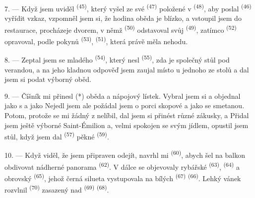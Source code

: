 7. --- Když jsem uviděl  \textsuperscript{(45)}, který vyšel ze své
 \textsuperscript{(47)} položené v 
\textsuperscript{(48)}, aby poslal  \textsuperscript{(46)} vyřídit vzkaz,
vzpomněl jsem si, že hodina oběda je blízko, a vstoupil jsem do restaurace, procházeje dvorem,
v němž  \textsuperscript{(50)} odstavoval svůj
 \textsuperscript{(49)}, zatímco 
\textsuperscript{(52)} opravoval, podle pokynů  \textsuperscript{(53)},
 \textsuperscript{(51)}, která právě měla nehodu.

8. --- Zeptal jsem se mladého  \textsuperscript{(54)}, který nesl
 \textsuperscript{(55)}, zda je společný stůl pod verandou, a na
jeho kladnou odpověď jsem zaujal místo u jednoho ze stolů a dal jsem si podat výborný oběd.


\VUsaut{4.0mm}
\VUsaut{3.0mm}

9. --- Číšník mi přinesl  (*) oběda a nápojový lístek. Vybral jsem si a
objednal jako  s  a jako
 Nejedl jsem  ale požádal
jsem o porci skopové  a jako  se smetanou. Potom,
protože se mi žádný z  nelíbil, dal jsem si přinést různé zákusky,
  a  Přidal jsem ještě výborné
 Saint-Émilion a, velmi spokojen se svým jídlem, opustil jsem stůl, když
jsem dal  \textsuperscript{(57)} pěkné 
\textsuperscript{(59)}.

10. --- Když viděl, že jsem připraven odejít, navrhl mi 
\textsuperscript{(60)}, abych šel na balkon obdivovat nádherné panorama
 \textsuperscript{(62)}. V dálce se objevovaly rybářské
 \textsuperscript{(63)},  \textsuperscript{(64)} a
obrovský  \textsuperscript{(65)}, jehož černá silueta vystupovala na bílých
 \textsuperscript{(67)}  \textsuperscript{(66)}. Lehký vánek
rozvlnil  \textsuperscript{(70)} zasazený nad 
\textsuperscript{(69)}  \textsuperscript{(68)}.

